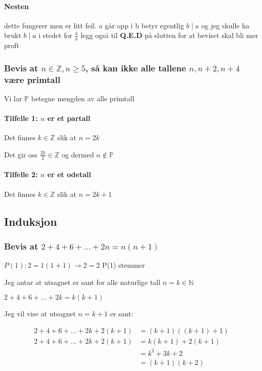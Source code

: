\documentclass{article}
\begin{document}
\paragraph{Nesten}

dette fungerer men er litt feil. a går opp i b betyr egentlig $b \mid a$
og jeg skulle ha brukt $b \mid a$ i stedet for $\frac{b}{a}$
legg også til \textbf{Q.E.D} på slutten for at beviset skal bli mer proft

\subsubsection{Bevis at $n \in \mathbb{Z}, n \geq 5$, så kan ikke alle tallene $n, n+2, n+4$ være primtall}

Vi lar $\mathbb{P}$ betegne mengden av alle primtall

\paragraph{Tilfelle 1: $n$ er et partall}

Det finnes $k \in \mathbb{Z}$ slik at $n=2k$

Det gir oss $\frac{2k}{2} \in \mathbb{Z}$ og dermed $n \notin \mathbb{P}$

\paragraph{Tilfelle 2: $n$ er et odetall}

Det finnes $k \in \mathbb{Z}$ slik at $n=2k+1$

\subsection{Induksjon}

\subsubsection{Bevis at $2+4+6+...+2n=n(n+1)$}

$P(1): 2=1(1+1) \rightarrow 2=2$ P(1) stemmer 

Jeg antar at utsagnet er sant for alle naturlige tall $n=k \in \mathbb{N}$

$2+4+6+...+2k=k(k+1)$

Jeg vil vise at utsagnet $n = k + 1$ er sant:

\begin{align*}
    2+4+6+...+2k+2(k+1) &= (k+1)((k+1) + 1) \\
    2+4+6+...+2k+2(k+1) &= k(k+1)+2(k+1) \\
    &= k^2+3k+2 \\
    &= (k+1)(k+2)
\end{align*}
\end{document}
